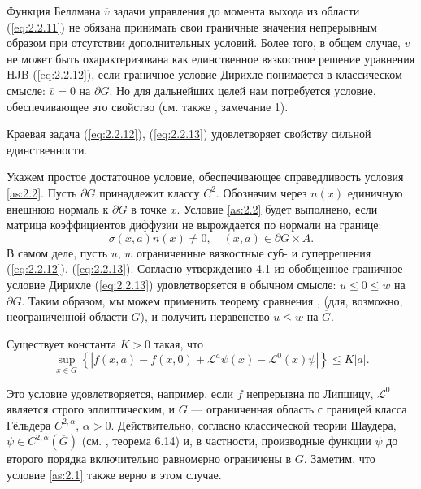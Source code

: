 Функция Беллмана $\overline v$ задачи управления до момента выхода из области (\ref{eq:2.2.11}) не обязана принимать свои граничные значения непрерывным образом при отсутствии дополнительных условий. Более того, в общем случае, $\overline v$ не может быть охарактеризована как единственное вязкостное решение уравнения HJB (\ref{eq:2.2.12}), если граничное условие Дирихле понимается в классическом смысле: $\overline v=0$ на $\partial G$. Но для дальнейших целей нам потребуется условие, обеспечивающее это свойство (см. также \cite{Rok14}, замечание 1).

\begin{assumption} \label{as:2.2}
Краевая задача (\ref{eq:2.2.12}), (\ref{eq:2.2.13}) удовлетворяет свойству сильной единственности.
\end{assumption}

Укажем простое достаточное условие, обеспечивающее справедливость условия \ref{as:2.2}. Пусть $\partial G$ принадлежит классу $C^2$. Обозначим через $n(x)$ единичную внешнюю нормаль к $\partial G$ в точке $x$. Условие \ref{as:2.2} будет выполнено, если матрица коэффициентов диффузии не вырождается по нормали на границе:
\begin{equation} \label{eq:2.2.13A}
\sigma(x,a) n(x) \neq 0, \quad (x,a) \in \partial G \times A.
\end{equation}
В самом деле, пусть $u$, $w$ ограниченные вязкостные суб- и суперрешения (\ref{eq:2.2.12}), (\ref{eq:2.2.13}).  Согласно утверждению 4.1 из \cite{BarRou98} обобщенное граничное условие Дирихле (\ref{eq:2.2.13}) удовлетворяется в обычном смысле: $u\le 0\le w$ на $\partial G$. Таким образом, мы можем применить теорему сравнения \cite[Theorem 7.3]{Ish89}, \cite[Theorem 4.2]{MotSar08a} (для, возможно, неограниченной области $G$), и получить неравенство $u\le w$ на $\overline G$.

\begin{assumption} \label{as:2.3}
Существует константа $K>0$ такая, что
$$ \sup_{x\in G}\left\{|f(x,a)-f(x,0)+\mathcal L^a\psi(x)-\mathcal L^0(x)\psi|\right\}\le K|a|.$$
\end{assumption}

Это условие удовлетворяется, например, если  $f$ непрерывна по Липшицу, $\mathcal L^0$ является строго эллиптическим, и $G$ --- ограниченная область с границей класса Гёльдера $C^{2,\alpha}$, $\alpha>0$. Действительно, согласно классической теории Шаудера, $\psi\in C^{2,\alpha}(\overline G)$ (см. \cite{GilTru01}, теорема 6.14) и, в частности, производные функции $\psi$ до второго порядка включительно равномерно ограничены в $G$. Заметим, что условие \ref{as:2.1} также верно в этом случае.

